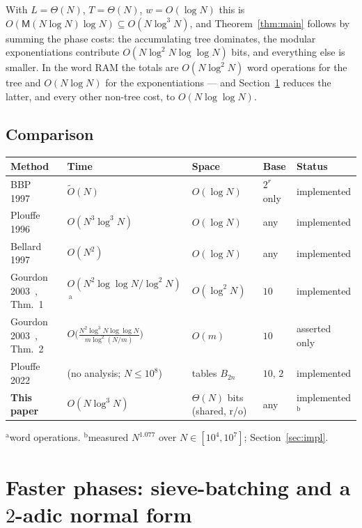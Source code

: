 \documentclass[11pt]{article}
\theoremstyle{remark}
\theoremstyle{definition}
\newcommand{\M}{\mathsf{M}}
\newcommand{\Ot}{\widetilde{O}}
\begin{document}
With $L=\Theta(N)$, $T=\Theta(N)$, $w=O(\log N)$ this is
$O(\M(N\log N)\log N)\subseteq O(N\log^{3}N)$, and Theorem~\ref{thm:main}
follows by summing the phase costs: the accumulating tree dominates, the
modular exponentiations contribute $O(N\log^{2}N\log\log N)$ bits, and
everything else is smaller. In the word RAM the totals are
$O(N\log^{2}N)$ word operations for the tree and $O(N\log N)$ for the
exponentiations --- and Section~\ref{sec:improve} reduces the latter, and
every other non-tree cost, to $O(N\log\log N)$.

\subsection{Comparison}

\begin{center}
\footnotesize
\setlength{\tabcolsep}{4pt}
\begin{tabular}{lllll}
\toprule
Method & Time & Space & Base & Status\\
\midrule
BBP 1997~\cite{BBP97} & $\Ot(N)$ & $O(\log N)$ & $2^{r}$ only & implemented\\
Plouffe 1996~\cite{Plouffe96} & $O(N^{3}\log^{3}N)$ & $O(\log N)$ & any & implemented\\
Bellard 1997~\cite{Bellard97} & $O(N^{2})$ & $O(\log N)$ & any & implemented\\
Gourdon 2003~\cite{Gourdon03}, Thm.~1 & $O(N^{2}\log\log N/\log^{2}N)$\,$^{\mathrm a}$ & $O(\log^{2}N)$ & $10$ & implemented\\
Gourdon 2003~\cite{Gourdon03}, Thm.~2 & $O\!\bigl(\tfrac{N^{2}\log^{3}N\log\log N}{m\log^{2}(N/m)}\bigr)$ & $O(m)$ & $10$ & asserted only\\
Plouffe 2022~\cite{Plouffe22} & (no analysis; $N\le 10^{8}$) & tables $B_{2n}$ & $10$, $2$ & implemented\\
\textbf{This paper} & $O(N\log^{3}N)$ & $\Theta(N)$ bits (shared, r/o) & any & implemented$^{\mathrm b}$\\
\bottomrule
\end{tabular}

\smallskip
\parbox{0.92\textwidth}{\footnotesize $^{\mathrm a}$word operations.\quad
$^{\mathrm b}$measured $N^{1.077}$ over $N\in[10^{4},10^{7}]$;
Section~\ref{sec:impl}.}
\end{center}

\section{Faster phases: sieve-batching and a $2$-adic normal form}
\label{sec:improve}
\end{document}
